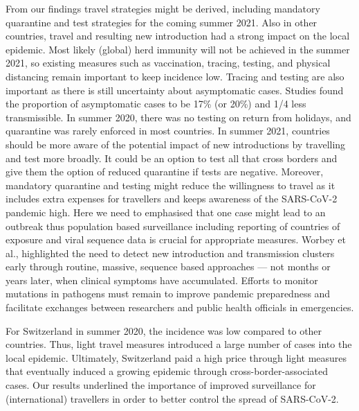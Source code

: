 \documentclass[10pt, a4paper, twoside]{article}
\begin{document}
\begin{multicols}{2}
From our findings travel strategies might be derived, including mandatory quarantine and test strategies for the coming summer 2021.
Also in other countries, travel and resulting new introduction had a strong impact on the local epidemic.\cite{worobey_emergence_2020,russell_effect_2021,hodcroft_spread_2021}
Most likely (global) herd immunity will not be achieved in the summer 2021, so existing measures such as vaccination, tracing, testing, and physical distancing remain important to keep incidence low.
Tracing and testing are also important as there is still uncertainty about asymptomatic cases.\cite{nogrady_what_2020,buitrago-garcia_occurrence_2020}
Studies found the proportion of asymptomatic cases to be 17\% (or 20\%) and 1/4 less transmissible.\cite{byambasuren_estimating_2020,buitrago-garcia_occurrence_2020,bi_household_2020}
In summer 2020, there was no testing on return from holidays, and quarantine was rarely enforced in most countries. 
In summer 2021, countries should be more aware of the potential impact of new introductions by travelling and test more broadly.
It could be an option to test all that cross borders and give them the option of reduced quarantine if tests are negative.\cite{ashcroft_quantifying_2021}
Moreover, mandatory quarantine and testing might reduce the willingness to travel as it includes extra expenses for travellers and keeps awareness of the SARS-CoV-2 pandemic high.
Here we need to emphasised that one case might lead to an outbreak thus population based surveillance including reporting of countries of exposure and viral sequence data is crucial for appropriate measures.\cite{worobey_emergence_2020}
Worbey et al., highlighted the need to detect new introduction and transmission clusters early through routine, massive, sequence based approaches — not months or years later, when clinical symptoms have accumulated.\cite{worobey_emergence_2020}
Efforts to monitor mutations in pathogens must remain to improve pandemic preparedness and facilitate exchanges between researchers and public health officials in emergencies.

For Switzerland in summer 2020, the incidence was low compared to other countries.
Thus, light travel measures introduced a large number of cases into the local epidemic.
Ultimately, Switzerland paid a high price through light measures that eventually induced a growing epidemic through cross-border-associated cases.
Our results underlined the importance of improved surveillance for (international) travellers in order to better control the spread of SARS-CoV-2.



\end{multicols}
\end{document}
